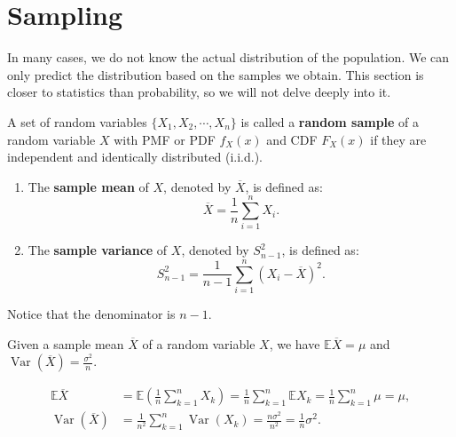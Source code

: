 \documentclass{huhtakm-template-book-v2}
\newcommand{\expect}{\mathbb{E}}
\DeclareMathOperator{\Var}{Var}
\begin{document}
\section{Sampling}
    In many cases, we do not know the actual distribution of the population. We can only predict the distribution based on the samples we obtain. This section is closer to statistics than probability, so we will not delve deeply into it.
    \begin{defn}
        A set of random variables $\{X_{1},X_{2},\cdots,X_{n}\}$ is called a \textbf{random sample} of a random variable $X$ with PMF or PDF $f_{X}(x)$ and CDF $F_{X}(x)$ if they are independent and identically distributed (i.i.d.).
        \begin{enumerate}
            \item The \textbf{sample mean} of $X$, denoted by $\overline{X}$, is defined as:
            \begin{equation*}
                \overline{X} = \frac{1}{n}\sum_{i = 1}^{n}X_{i}.
            \end{equation*}
            \item The \textbf{sample variance} of $X$, denoted by $S_{n-1}^{2}$, is defined as:
            \begin{equation*}
                S_{n-1}^{2} = \frac{1}{n-1}\sum_{i = 1}^{n}(X_{i}-\overline{X})^{2}.
            \end{equation*}
        \end{enumerate}
    \end{defn}
    \begin{rem}
        Notice that the denominator is $n-1$.
    \end{rem}
    \begin{thm}
        \label{Chapter 7 (Theorem) Expectation and variance of sample mean}
        Given a sample mean $\overline{X}$ of a random variable $X$, we have $\expect{\overline{X}} = \mu$ and $\Var(\overline{X}) = \frac{\sigma^{2}}{n}$.
    \end{thm}
    \begin{proofing}
        \begin{align*}
            \expect{\overline{X}} &= \expect\left(\frac{1}{n}\sum_{k = 1}^{n}X_{k}\right) = \frac{1}{n}\sum_{k = 1}^{n}\expect{X_{k}} = \frac{1}{n}\sum_{k = 1}^{n}\mu = \mu,\\
            \Var(\overline{X}) &= \frac{1}{n^{2}}\sum_{k = 1}^{n}\Var(X_{k}) = \frac{n\sigma^{2}}{n^{2}} = \frac{1}{n}\sigma^{2}.
        \end{align*}
    \end{proofing}
\end{document}

